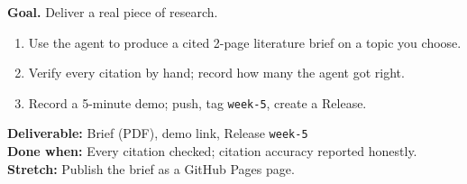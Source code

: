 \begin{tcolorbox}[enhanced,breakable,colback=white,colframe=sun,boxrule=0.8pt,arc=2pt,left=7pt,right=7pt,top=4pt,bottom=4pt,
  title={\bfseries Saturday --- Analyst report demo\hfill\normalfont\small 3 h},coltitle=white,colbacktitle=sun,fonttitle=\small]
\textbf{Goal.} Deliver a real piece of research.
\begin{enumerate}[itemsep=1pt,topsep=2pt]
  \item Use the agent to produce a cited 2-page literature brief on a topic you choose.
  \item Verify every citation by hand; record how many the agent got right.
  \item Record a 5-minute demo; push, tag \texttt{week-5}, create a Release.
\end{enumerate}
\textbf{\color{dataC}Deliverable:} Brief (PDF), demo link, Release \texttt{week-5}\\
\textbf{\color{navy}Done when:} Every citation checked; citation accuracy reported honestly.\\
\textbf{\color{skillC}Stretch:} Publish the brief as a GitHub Pages page.
\end{tcolorbox}

